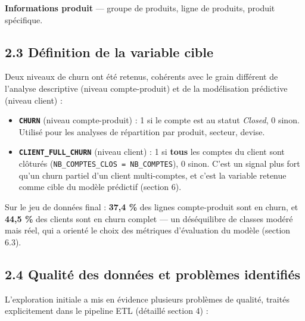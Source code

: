 \documentclass[11pt,a4paper]{article}
\providecommand{\tightlist}{\setlength{\itemsep}{0pt}\setlength{\parskip}{0pt}}
\begin{document}
\textbf{Informations produit} --- groupe de produits, ligne de produits,
produit spécifique.

\hypertarget{duxe9finition-de-la-variable-cible}{%
\subsection{2.3 Définition de la variable
cible}\label{duxe9finition-de-la-variable-cible}}

Deux niveaux de churn ont été retenus, cohérents avec le grain différent
de l'analyse descriptive (niveau compte-produit) et de la modélisation
prédictive (niveau client) :

\begin{itemize}
\tightlist
\item
  \textbf{\texttt{CHURN}} (niveau compte-produit) : 1 si le compte est
  au statut \emph{Closed}, 0 sinon. Utilisé pour les analyses de
  répartition par produit, secteur, devise.
\item
  \textbf{\texttt{CLIENT\_\hspace{0pt}FULL\_\hspace{0pt}CHURN}} (niveau
  client) : 1 si \textbf{tous} les comptes du client sont clôturés
  (\texttt{NB\_\hspace{0pt}COMPTES\_\hspace{0pt}CLOS\ =\ NB\_\hspace{0pt}COMPTES}),
  0 sinon. C'est un signal plus fort qu'un churn partiel d'un client
  multi-comptes, et c'est la variable retenue comme cible du modèle
  prédictif (section 6).
\end{itemize}

Sur le jeu de données final : \textbf{37,4 \%} des lignes compte-produit
sont en churn, et \textbf{44,5 \%} des clients sont en churn complet ---
un déséquilibre de classes modéré mais réel, qui a orienté le choix des
métriques d'évaluation du modèle (section 6.3).

\hypertarget{qualituxe9-des-donnuxe9es-et-probluxe8mes-identifiuxe9s}{%
\subsection{2.4 Qualité des données et problèmes
identifiés}\label{qualituxe9-des-donnuxe9es-et-probluxe8mes-identifiuxe9s}}

L'exploration initiale a mis en évidence plusieurs problèmes de qualité,
traités explicitement dans le pipeline ETL (détaillé section 4) :
\end{document}
